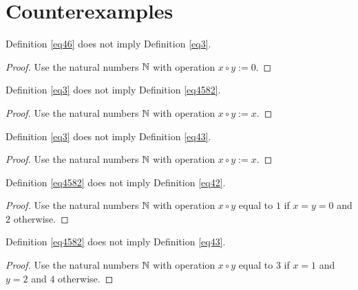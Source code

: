\chapter{Counterexamples}

\begin{theorem}\label{46_not_imply_3} Definition \ref{eq46} does not imply Definition \ref{eq3}.
\end{theorem}

\begin{proof} Use the natural numbers $\mathbb{N}$ with operation $x \circ y := 0$.
\end{proof}

\begin{theorem}\label{3_not_imply_4582} Definition \ref{eq3} does not imply Definition \ref{eq4582}.
\end{theorem}

\begin{proof} Use the natural numbers $\mathbb{N}$ with operation $x \circ y := x$.
\end{proof}

\begin{theorem}\label{3_not_imply_43} Definition \ref{eq3} does not imply Definition \ref{eq43}.
\end{theorem}

\begin{proof} Use the natural numbers $\mathbb{N}$ with operation $x \circ y := x$.
\end{proof}

\begin{theorem}\label{4582_not_imply_42} Definition \ref{eq4582} does not imply Definition \ref{eq42}.
\end{theorem}

\begin{proof} Use the natural numbers $\mathbb{N}$ with operation
$x \circ y$ equal to $1$ if $x=y=0$ and $2$ otherwise.
\end{proof}

\begin{theorem}\label{4582_not_imply_43} Definition \ref{eq4582} does not imply Definition \ref{eq43}.
\end{theorem}

\begin{proof} Use the natural numbers $\mathbb{N}$ with operation $x \circ y$ equal to $3$ if $x=1$ and $y=2$ and $4$ otherwise.
\end{proof}

